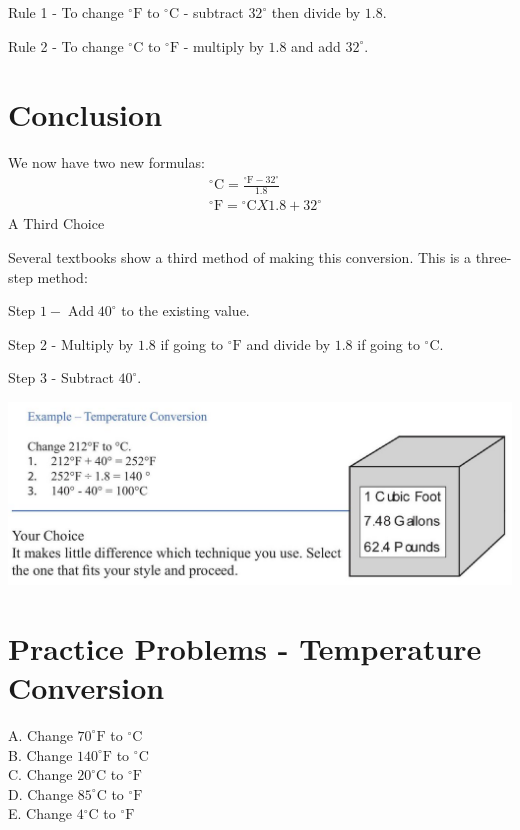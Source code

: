 \documentclass[10pt]{article}
\begin{document}
Rule 1 - To change ${ }^{\circ} \mathrm{F}$ to ${ }^{\circ} \mathrm{C}$ - subtract $32^{\circ}$ then divide by $1.8$.

Rule 2 - To change ${ }^{\circ} \mathrm{C}$ to ${ }^{\circ} \mathrm{F}$ - multiply by $1.8$ and add $32^{\circ}$.

\section{Conclusion}
We now have two new formulas:
$$
\begin{aligned}
&{ }^{\circ} \mathrm{C}=\frac{{ }^{\circ} \mathrm{F}-32^{\circ}}{1.8} \\
&{ }^{\circ} \mathrm{F}={ }^{\circ} \mathrm{C} X 1.8+32^{\circ}
\end{aligned}
$$
A Third Choice

Several textbooks show a third method of making this conversion. This is a three-step method:

Step $1-\operatorname{Add} 40^{\circ}$ to the existing value.

Step 2 - Multiply by $1.8$ if going to ${ }^{\circ} \mathrm{F}$ and divide by $1.8$ if going to ${ }^{\circ} \mathrm{C}$.

Step 3 - Subtract $40^{\circ}$.

\includegraphics[max width=\textwidth]{2022_09_11_72dbedc910e6e984560cg-41}

\section{Practice Problems - Temperature Conversion}
A. Change $70^{\circ} \mathrm{F}$ to ${ }^{\circ} \mathrm{C}$\\
B. Change $140^{\circ} \mathrm{F}$ to ${ }^{\circ} \mathrm{C}$\\
C. Change $20^{\circ} \mathrm{C}$ to ${ }^{\circ} \mathrm{F}$\\
D. Change $85^{\circ} \mathrm{C}$ to ${ }^{\circ} \mathrm{F}$\\
E. Change $4{ }^{\circ} \mathrm{C}$ to ${ }^{\circ} \mathrm{F}$
\end{document}
